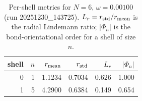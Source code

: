 \begin{table}[t]
\centering
\small
\setlength{\tabcolsep}{4pt}
\renewcommand{\arraystretch}{1.15}
\begin{tabular}{r r r r r r}
\toprule
shell & $n$ & $r_{\rm mean}$ & $r_{\rm std}$ & $L_r$ & $|\Phi_n|$ \\
\midrule
0 & 1 & 1.1234 & 0.7034 & 0.626 & 1.000 \\
1 & 5 & 4.2900 & 0.6384 & 0.149 & 0.654 \\
\bottomrule
\end{tabular}
\caption{Per-shell metrics for $N=6$, $\omega=0.00100$ (run 20251230_143725). $L_r=r_{\rm std}/r_{\rm mean}$ is the radial Lindemann ratio; $|\Phi_n|$ is the bond-orientational order for a shell of size $n$.}
\end{table}